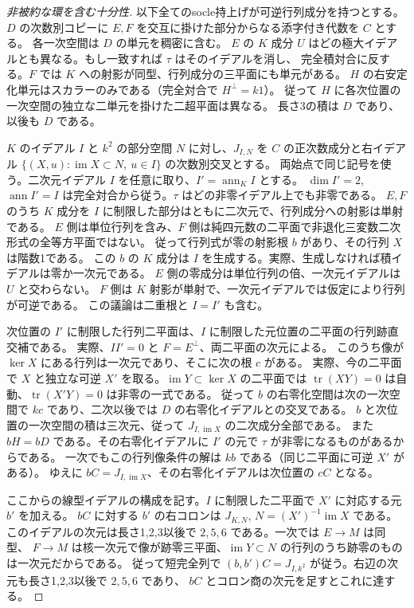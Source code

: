 \begin{proof}[非被約な環を含む十分性]
以下全てのsocle持上げが可逆行列成分を持つとする。
$D$ の次数別コピーに $E,F$ を交互に掛けた部分からなる添字付き代数を $C$ とする。
各一次空間は $D$ の単元を稠密に含む。
$E$ の $K$ 成分 $U$ はどの極大イデアルとも異なる。もし一致すれば $\tau$ はそのイデアルを消し、
完全積対合に反する。$F$ では $K$ への射影が同型、行列成分の三平面にも単元がある。
$H$ の右安定化単元はスカラーのみである（完全対合で $H^\perp=k1$）。
従って $H$ に各次位置の一次空間の独立な二単元を掛けた二超平面は異なる。
長さ3の積は $D$ であり、以後も $D$ である。

$K$ のイデアル $I$ と $k^2$ の部分空間 $N$ に対し、$J_{I,N}$ を
$C$ の正次数成分と右イデアル $\{(X,u):\operatorname{im}X\subset N,\ u\in I\}$ の次数別交叉とする。
両始点で同じ記号を使う。二次元イデアル $I$ を任意に取り、$I'=\operatorname{ann}_K I$ とする。
$\dim I'=2$, $\operatorname{ann} I'=I$ は完全対合から従う。$\tau$ はどの非零イデアル上でも非零である。
$E,F$ のうち $K$ 成分を $I$ に制限した部分はともに二次元で、行列成分への射影は単射である。
$E$ 側は単位行列を含み、$F$ 側は純四元数の二平面で非退化三変数二次形式の全等方平面ではない。
従って行列式が零の射影根 $b$ があり、その行列 $X$ は階数1である。
この $b$ の $K$ 成分は $I$ を生成する。実際、生成しなければ積イデアルは零か一次元である。
$E$ 側の零成分は単位行列の倍、一次元イデアルは $U$ と交わらない。
$F$ 側は $K$ 射影が単射で、一次元イデアルでは仮定により行列が可逆である。
この議論は二重根と $I=I'$ も含む。

次位置の $I'$ に制限した行列二平面は、$I$ に制限した元位置の二平面の行列跡直交補である。
実際、$I I'=0$ と $F=E^\perp$、両二平面の次元による。
このうち像が $\ker X$ にある行列は一次元であり、そこに次の根 $c$ がある。
実際、今の二平面で $X$ と独立な可逆 $X'$ を取る。$\operatorname{im}Y\subset\ker X$ の二平面では
$\operatorname{tr}(XY)=0$ は自動、$\operatorname{tr}(X'Y)=0$ は非零の一式である。
従って $b$ の右零化空間は次の一次空間で $kc$ であり、二次以後では $D$ の右零化イデアルとの交叉である。
$b$ と次位置の一次空間の積は三次元、従って $J_{I,\operatorname{im}X}$ の二次成分全部である。
また $bH=bD$ である。その右零化イデアルに $I'$ の元で $\tau$ が非零になるものがあるからである。
一次でもこの行列像条件の解は $kb$ である（同じ二平面に可逆 $X'$ がある）。
ゆえに $bC=J_{I,\operatorname{im}X}$、その右零化イデアルは次位置の $cC$ となる。

ここからの線型イデアルの構成を記す。$I$ に制限した二平面で $X'$ に対応する元 $b'$ を加える。
$bC$ に対する $b'$ の右コロンは $J_{K,N}$, $N=(X')^{-1}\operatorname{im}X$ である。
このイデアルの次元は長さ1,2,3以後で $2,5,6$ である。一次では $E\to M$ は同型、
$F\to M$ は核一次元で像が跡零三平面、$\operatorname{im}Y\subset N$ の行列のうち跡零のものは一次元だからである。
従って短完全列で $(b,b')C=J_{I,k^2}$ が従う。右辺の次元も長さ1,2,3以後で $2,5,6$ であり、
$bC$ とコロン商の次元を足すとこれに達する。


\end{proof}
